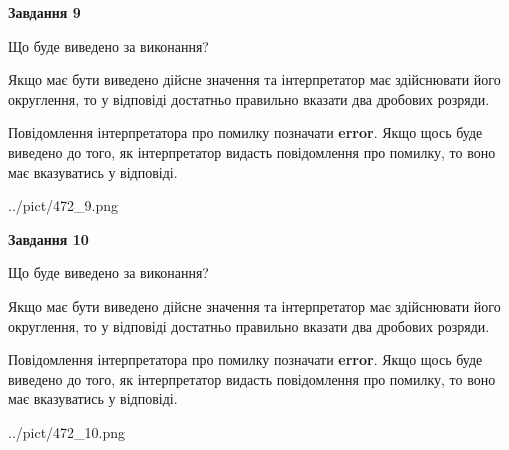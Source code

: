 \documentclass[12pt, ukrainian]{article}
\begin{document}
{\begin {Large}
{\begin {center}\textbf{Завдання 9}\end {center}}\par
Що буде виведено за виконання? \par

Якщо має бути виведено дійсне значення та інтерпретатор має здійснювати його округлення, 
то у відповіді достатньо правильно вказати два дробових розряди.

Повідомлення інтерпретатора про помилку позначати \textbf{error}.
Якщо щось буде виведено до того, як інтерпретатор видасть повідомлення про помилку, 
то воно має вказуватись у відповіді. \par

\begin{center}
	{../pict/472_9.png}
\end{center}
\newpage

{\begin {center}\textbf{Завдання 10}\end {center}}\par
Що буде виведено за виконання? \par

Якщо має бути виведено дійсне значення та інтерпретатор має здійснювати його округлення, 
то у відповіді достатньо правильно вказати два дробових розряди.

Повідомлення інтерпретатора про помилку позначати \textbf{error}.
Якщо щось буде виведено до того, як інтерпретатор видасть повідомлення про помилку, 
то воно має вказуватись у відповіді. \par

\begin{center}
	{../pict/472_10.png}
\end{center}
\newpage

\end {Large}}
\end{document}
